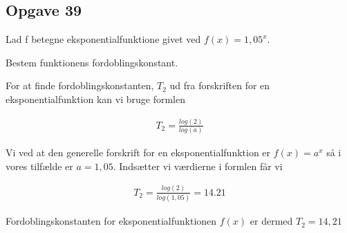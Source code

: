 \subsection{Opgave 39}

Lad f betegne eksponentialfunktione givet ved $f(x) = 1,05^x$.

Bestem funktionens fordoblingskonstant.

\ans

For at finde fordoblingskonstanten, $T_2$ ud fra forskriften for en eksponentialfunktion kan vi bruge formlen

\begin{align*}
    T_2 = \frac{log(2)}{log(a)}
\end{align*}

Vi ved at den generelle forskrift for en eksponentialfunktion er $f(x) = a^x$ så i vores tilfælde er $a = 1,05$.
Indsætter vi værdierne i formlen får vi

\begin{align*}
    T_2 = \frac{log(2)}{log(1,05)} = 14.21
\end{align*}

Fordoblingskonstanten for eksponentialfunktionen $f(x)$ er dermed $T_2 = 14,21$

